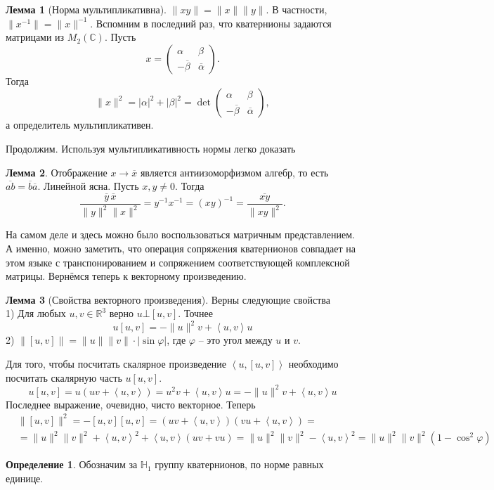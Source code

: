 \documentclass[10pt,a4paper,oneside]{book}
\theoremstyle{definition}
\newtheorem*{defn}{\color{yellow!30!red} Определение}
\newtheorem{lem}{\color{green!50!black}Лемма}
\newcommand{\mb}[1]{\mathbb{#1}}
\newcommand{\ovl}{\overline}
\def\ffi{\varphi}
\def\lan{\left\langle }
\def\ran{\right\rangle}
\def\dfn{\begin{defn}}
\def\edfn{\end{defn}}
\def\lm{\begin{lem}}
\def\elm{\end{lem}}
\def\pmat{\begin{pmatrix}}
\def\epmat{\end{pmatrix}}
\begin{document}
\lm[Норма мультипликативна] $\|xy\|=\|x\|\|y\|$. В частности, $\|x^{-1}\|=\|x\|^{-1}$.
\proof Вспомним в последний раз, что кватернионы задаются матрицами из $M_2(\mb C)$. Пусть 
$$x=\pmat \alpha & \beta \\ -\ovl{\beta} & \ovl{\alpha}\epmat.$$
Тогда $$\|x\|^2=|\alpha|^2+|\beta|^2=\det \pmat \alpha & \beta \\ -\ovl{\beta} & \ovl{\alpha}\epmat,$$
а определитель мультипликативен.
\endproof
\elm



Продолжим. Используя мультипликативность нормы легко доказать 
\lm Отображение $x \to \ovl{x}$ является антиизоморфизмом алгебр, то есть $\ovl{ab}=\ovl{b}\ovl{a}$.
\proof Линейной ясна. Пусть $x,y \neq 0$. Тогда $$\frac{\ovl{y}\,\ovl{x}}{\|y\|^2\|x\|^2}=y^{-1}x^{-1}=(xy)^{-1}=\frac{\ovl{xy}}{\|xy\|^2}.$$
\elm

На самом деле и здесь можно было воспользоваться матричным представлением. А именно, можно заметить, что операция сопряжения кватернионов совпадает на этом языке с транспонированием и сопряжением соответствующей комплексной матрицы. Вернёмся теперь к векторному произведению.





\lm[Свойства векторного произведения] Верны следующие свойства\\
1) Для любых $u,v \in \mb R^3$ верно $u\bot [u,v]$. Точнее $$u[u,v]= -\|u\|^2v+ \lan u,v\ran u$$
2) $\| [u,v]\|= \|u\|\|v\| \cdot |\sin \ffi |$, где $\ffi$ --  это угол между $u$ и $v$.
\elm
\proof Для того, чтобы посчитать скалярное произведение $\lan u, [u,v]\ran$ необходимо посчитать скалярную часть $u[u,v]$. 
$$u[u,v]= u (uv+ \lan u,v \ran)= u^2 v+ \lan u,v \ran u= -\|u\|^2 v+ \lan u,v \ran u$$
Последнее выражение, очевидно, чисто векторное.
Теперь
\begin{align*}
&\|[u,v]\|^2= -[u,v][u,v]= (uv + \lan u,v\ran)(vu + \lan u,v\ran)=\\
&=\|u\|^2\|v\|^2+ \lan u,v\ran^2 + \lan u,v\ran (uv+vu)=\|u\|^2\|v\|^2 - \lan u,v\ran^2= \|u\|^2\|v\|^2(1-\cos^2 \ffi)
\end{align*}
\endproof

\dfn Обозначим за $\mb H_{1}$ группу кватернионов, по норме равных единице.
\edfn
\end{document}
